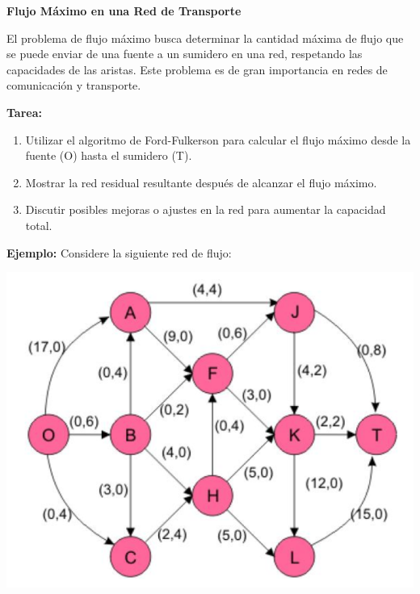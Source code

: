 \documentclass{article}
\begin{document}
\begin{problem}
\textbf{Flujo Máximo en una Red de Transporte}

El problema de flujo máximo busca determinar la cantidad máxima de flujo que se puede enviar de una fuente a un sumidero en una red, respetando las capacidades de las aristas. Este problema es de gran importancia en redes de comunicación y transporte.

\textbf{Tarea:}
\begin{enumerate}
    \item Utilizar el algoritmo de Ford-Fulkerson para calcular el flujo máximo desde la fuente (O) hasta el sumidero (T).
    \item Mostrar la red residual resultante después de alcanzar el flujo máximo.
    \item Discutir posibles mejoras o ajustes en la red para aumentar la capacidad total.
\end{enumerate}

\textbf{Ejemplo:} Considere la siguiente red de flujo:

\begin{center}
    \includegraphics[scale=0.5]{images/trabajo02-2.png}
\end{center}
\end{problem}
\end{document}
